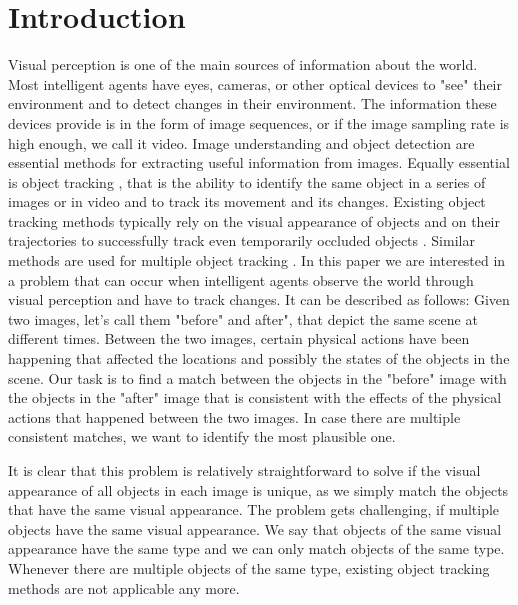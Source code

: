 \documentclass[letterpaper]{article}
\begin{document}
\section{Introduction}

Visual perception is one of the main sources of information about the world. Most intelligent agents have eyes, cameras, or other optical devices to "see" their environment and to detect changes in their environment. The information these devices provide is in the form of image sequences, or if the image sampling rate is high enough, we call it video.
Image understanding \cite{sonka1999image, sridhar_video_2011} and object detection \cite{papageorgiou1998general} are essential methods for extracting useful information from images. Equally essential is object tracking \cite{yilmaz2006object}, that is the ability to identify the same object in a series of images or in video and to track its movement and its changes. Existing object tracking methods typically rely on the visual appearance of objects and on their trajectories to successfully track even temporarily occluded objects \cite{yilmaz2004contour,cutler2000robust,viola2005detecting}.
Similar methods are used for multiple object tracking \cite{berclaz2011multiple,yang2005fast,han2004algorithm}.
In this paper we are interested in a problem that can occur when intelligent agents observe the world through visual perception and have to track changes.
It can be described as follows: Given two images, let's call them "before" and after", that depict the same scene at different times. Between the two images, certain physical actions have been happening that affected the locations and possibly the states of the objects in the scene. Our task is to find a match between the objects in the "before" image with the objects in the "after" image that is consistent with the effects of the physical actions that happened between the two images. In case there are multiple consistent matches, we want to identify the most plausible one.

It is clear that this problem is relatively straightforward to solve if the visual appearance of all objects in each image is unique, as we simply match the objects that have the same visual appearance. The problem gets challenging, if multiple objects have the same visual appearance. We say that objects of the same visual appearance have the same type and we can only match objects of the same type. Whenever there are multiple objects of the same type, existing object tracking methods are not applicable any more.
\end{document}
